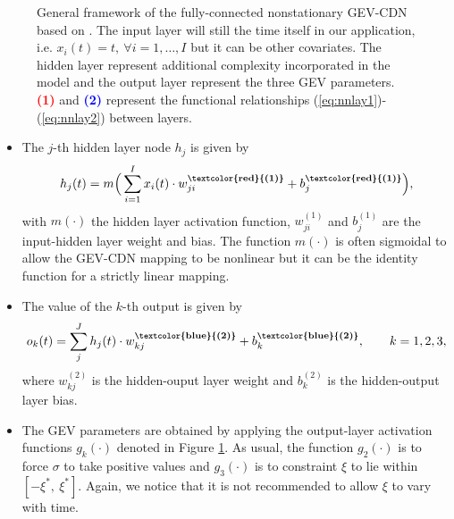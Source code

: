 \begin{figure}[!htb]
\begin{center}
{{
			}
		}
		\caption{General framework of the fully-connected nonstationary GEV-CDN based on \citet{cannon_flexible_2010}. The input layer will still the time itself in our application, i.e. $x_i(t)=t,  \ \forall i =1,\ldots,I$ but it can be other covariates. The hidden layer represent additional complexity incorporated in the model and the output layer represent the three GEV parameters. \textbf{\textcolor{red}{(1)}} and \textbf{\textcolor{blue}{(2)}} represent the functional relationships (\ref{eq:nnlay1})-(\ref{eq:nnlay2}) between layers. }\label{NN}
	\end{center}
\end{figure}


\begin{itemize} 

\item The $j$-th hidden layer node $h_j$ is given by 
\begin{equation}\label{eq:nnlay1}
h_j(t)=m\Big(\sum_{i=1}^{I}x_i(t)\cdot  w_{ji}^{\textbf{\textcolor{red}{(1)}}}+b_j^{\textbf{\textcolor{red}{(1)}}}\Big),
\end{equation}
with $m(\cdot)$ the hidden layer activation function, $w_{ji}^{(1)}$ and $b_j^{(1)}$ are the input-hidden layer weight and bias. The function $m(\cdot)$ is often sigmoidal to allow the GEV-CDN mapping to be nonlinear but it can be the identity function for a strictly linear mapping.

\item The value of the $k$-th output is given by 
\begin{equation}\label{eq:nnlay2}
o_k(t)=\sum_j^Jh_j(t)\cdot w_{kj}^{\textbf{\textbf{\textcolor{blue}{(2)}}}}+b^{\textbf{\textbf{\textcolor{blue}{(2)}}}}_k, \qquad k=1,2,3 ,
\end{equation}
where $w_{kj}^{(2)}$ is the hidden-ouput layer weight and $b^{(2)}_k$ is the hidden-output layer bias.
	
\item The GEV parameters are obtained by applying the output-layer activation functions $g_k(\cdot)$ denoted in Figure \ref{NN}. As usual, the function $g_2(\cdot)$ is to force $\sigma$ to take positive values and $g_3(\cdot)$ is to constraint $\xi$ to lie within $[-\xi^{*},\ \xi^{*}]$. Again, we notice that it is not recommended to allow $\xi$ to vary with time. 
	
\end{itemize}

